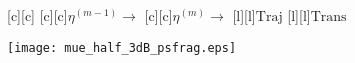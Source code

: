 \documentclass{article}
\begin{document}
\begin{figure}[htb]
  \begin{center}

        [c][c]{}
        [c][c]{$\eta^{(m-1)} \rightarrow$}
        [c][c]{$\eta^{(m)} \rightarrow$}
        [l][l]{$\mathrm{Traj}$}
        [l][l]{$\mathrm{Trans}$}
	

    \texttt{[image: mue\_half\_3dB\_psfrag.eps]}
    \end{center}
\end{figure}
\end{document}
